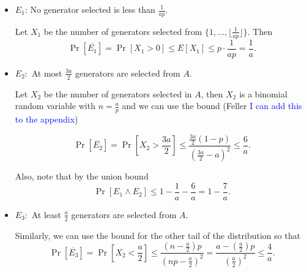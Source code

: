 \begin{itemize}
    \item $E_1$: No generator selected is less than $\frac{1}{ap}$.  \par
    Let $X_1$ be the number of generators selected from $\{1,\ldots,\lfloor\frac{1}{ap}\rfloor\}$. Then 
    \[\Pr[\overline{E_1}] = \Pr[X_1 > 0] \leq E[X_1] \leq p \cdot \frac{1}{ap} = \frac{1}{a}.\]

    \item $E_2:$ At most $\frac{3a}{2}$ generators are selected from $A$.\par 
    Let $X_2$ be the number of generators selected in $A$, then $X_2$ is a binomial random variable with $n = \frac{a}{p}$ and we can use the bound (Feller \textcolor{blue}{I can add this to the appendix})

    \[\Pr[\overline{E_2}] = \Pr\left[X_2 > \frac{3a}{2}\right] \leq  \frac{\frac{3a}{2}(1 - p)}{(\frac{3a}{2} - a)^2} \leq \frac{6}{a}.\]

    Also, note that by the union bound \[\Pr[E_1\land E_2] \leq 1 - \frac{1}{a} - \frac{6}{a} = 1 - \frac{7}{a}.\]  

    \item $E_3:$ At least $\frac{a}{2}$ generators are selected from $A$. \par 
    Similarly, we can use the bound for the other tail of the distribution so that 
    \[\Pr[ \overline{E_3}] = \Pr\left[X_2 < \frac{a}{2}\right] \leq  \frac{(n - \frac{a}{2})p}{(np - \frac{a}{2})^2} = \frac{a - (\frac{a}{2})p}{(\frac{a}{2})^2} \leq \frac{4}{a}.\]
    

\end{itemize}

